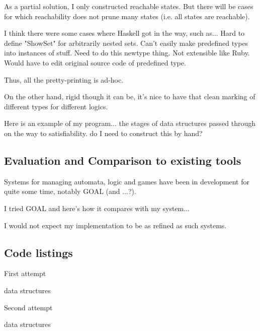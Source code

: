 As a partial solution, I only constructed reachable states.
But there will be cases for which reachability does not prune many states
(i.e. all states are reachable).


I think there were some cases where Haskell got in the way, such as...
Hard to define "ShowSet" for arbitrarily nested sets.
Can't easily make predefined types into instances of stuff.
Need to do this newtype thing. Not extensible like Ruby.
Would have to edit original source code of predefined type.

Thus, all the pretty-printing is ad-hoc.

On the other hand, rigid though it can be,
it's nice to have that clean marking
of different types for different logics.

Here is an example of my program...
the stages of data structures passed through on the way
to satisfiability.
do I need to construct this by hand?

\subsection{Evaluation and Comparison to existing tools}


Systems for managing automata, logic and games have been in development for quite some time, notably GOAL (and ...?).

I tried GOAL and here's how it compares with my system...

I would not expect my implementation to be as refined as such systems.

\subsection{Code listings}

First attempt


data structures


Second attempt


data structures
